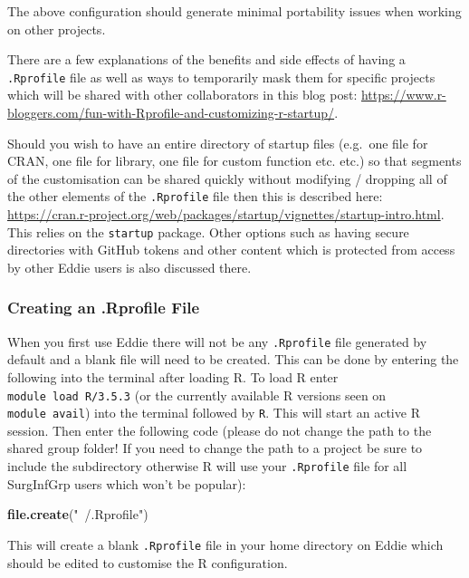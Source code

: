 \documentclass[
]{book}
\newenvironment{Shaded}{\begin{snugshade}}{\end{snugshade}}
\newcommand{\KeywordTok}[1]{\textcolor[rgb]{0.13,0.29,0.53}{\textbf{#1}}}
\newcommand{\NormalTok}[1]{#1}
\newcommand{\StringTok}[1]{\textcolor[rgb]{0.31,0.60,0.02}{#1}}
\begin{document}
The above configuration should generate minimal portability issues when working on other projects.

There are a few explanations of the benefits and side effects of having a \texttt{.Rprofile} file as well as ways to temporarily mask them for specific projects which will be shared with other collaborators in this blog post: \url{https://www.r-bloggers.com/fun-with-Rprofile-and-customizing-r-startup/}.

Should you wish to have an entire directory of startup files (e.g.~one file for CRAN, one file for library, one file for custom function etc. etc.) so that segments of the customisation can be shared quickly without modifying / dropping all of the other elements of the \texttt{.Rprofile} file then this is described here: \url{https://cran.r-project.org/web/packages/startup/vignettes/startup-intro.html}. This relies on the \texttt{startup} package. Other options such as having secure directories with GitHub tokens and other content which is protected from access by other Eddie users is also discussed there.

\hypertarget{creating-an-.rprofile-file}{%
\subsubsection{Creating an .Rprofile File}\label{creating-an-.rprofile-file}}

When you first use Eddie there will not be any \texttt{.Rprofile} file generated by default and a blank file will need to be created. This can be done by entering the following into the terminal after loading R. To load R enter \texttt{module\ load\ R/3.5.3} (or the currently available R versions seen on \texttt{module\ avail}) into the terminal followed by \texttt{R}. This will start an active R session. Then enter the following code (please do not change the path to the shared group folder! If you need to change the path to a project be sure to include the subdirectory otherwise R will use your \texttt{.Rprofile} file for all SurgInfGrp users which won't be popular):

\begin{Shaded}
\begin{Highlighting}[]
\KeywordTok{file.create}\NormalTok{(}\StringTok{"~/.Rprofile"}\NormalTok{)}
\end{Highlighting}
\end{Shaded}

This will create a blank \texttt{.Rprofile} file in your home directory on Eddie which should be edited to customise the R configuration.
\end{document}

